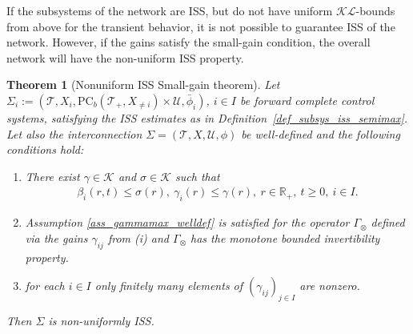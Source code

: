 \documentclass[twocolumn]{IEEEtran} %
\newtheorem{theorem}{Theorem}[section]
\theoremstyle{definition}
\newcommand{\tm}{\times}%
\newcommand{\Uc}{\mathcal{U}}%
\newcommand{\R}{\mathbb{R}}%
\newcommand{\K}{\mathcal{K}}%
\newcommand{\Kinf}{\mathcal{K_\infty}}%
\newcommand{\KL}{\mathcal{KL}}%
\newcommand{\PC}{\mathrm{PC}}%
\newcommand{\id}{\mathrm{id}}%
\newcommand{\T}{\ensuremath{\mathcal{T}}}  %
\newcommand \qrq   {\quad\Rightarrow\quad}
\begin{document}
If the subsystems of the network are ISS, but do not have uniform $\KL$-bounds from above for the transient behavior, it is not possible to guarantee ISS of the network. However, if the gains satisfy the small-gain condition, the overall network will have the non-uniform ISS property.

\begin{theorem}[Nonuniform ISS Small-gain theorem]
\label{thm:nonuniform-ISS_SGT-infinite-interconnections} 
Let $\Sigma_i:=(\T, X_i,\PC_b(\T_+,X_{\neq i}) \tm \Uc,\bar{\phi}_i)$, $i\in I$ be forward complete control systems, satisfying the ISS estimates as in 
Definition~\ref{def_subsys_iss_semimax}. Let also the interconnection $\Sigma=(\T, X,\Uc,\phi)$ be well-defined and the following conditions hold:%
\begin{enumerate}[label=(\roman*)]
	\item\label{itm:nonuniform-ISS-SGT-Ass1} There exist $\gamma \in\K$ and $\sigma \in\K$ such that%
\begin{eqnarray}
\beta_i(r,t)\leq \sigma(r),\  \gamma_i(r) \leq \gamma(r),\  r\in\R_+,\ t\geq 0,\ i\in I.
\label{eq:Bounds_on_beta_and_external_gamma-nonuniform}
\end{eqnarray}
	\item\label{itm:nonuniform-ISS-SGT-Ass2} Assumption \ref{ass_gammamax_welldef} is satisfied for the operator $\Gamma_{\otimes}$ defined via the gains $\gamma_{ij}$ from (i) and $\Gamma_{\otimes}$ has the monotone bounded invertibility property.
	\item\label{itm:nonuniform-ISS-SGT-Ass3} for each $i\in I$ only finitely many elements of $(\gamma_{ij})_{j\in I}$ are nonzero.
\end{enumerate} 
Then $\Sigma$ is non-uniformly ISS.
%
%
\end{theorem}
\end{document}
